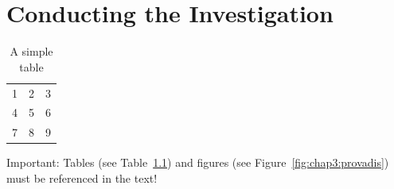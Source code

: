 %

\chapter{Conducting the Investigation}

\begin{table}[h]
    \centering
    \begin{tabular}{| l c r |}
        \hline
        1 & 2 & 3 \\
        4 & 5 & 6 \\
        7 & 8 & 9 \\
        \hline
    \end{tabular}
    \caption{A simple table}
    \label{tab:chap4:simpel}
\end{table}

Important: Tables (see Table~\ref{tab:chap4:simpel}) and figures (see Figure~\ref{fig:chap3:provadis}) must be referenced in the text!
